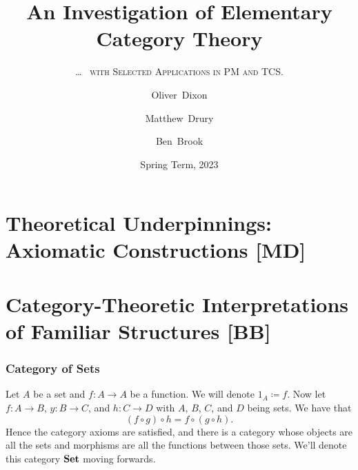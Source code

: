 \documentclass{beamer}
\title[Elementary Category Theory]%
{An Investigation of Elementary Category Theory}
\subtitle{\ldots\ \fontfamily{lmr}%
        \textsc{with Selected Applications in PM and TCS.}}
\author[Dixon, Drury \& Brook]%
{Oliver~Dixon \and Matthew~Drury \and Ben~Brook}
\institute[]{Department of Mathematics, University of York}
\date{Spring Term, 2023}
\numberwithin{figure}{section}
\DeclareMathOperator{\catset}{\text{\textbf{Set}}}
\begin{document}

\frame{\titlepage}

\section{Theoretical Underpinnings: Axiomatic Constructions [MD]}

\section{Category-Theoretic Interpretations of Familiar Structures [BB]}
\begin{frame}
        \frametitle{Category of Sets}
        Let $A$ be a set and $f \colon A \to A$ be a function. We will denote
        $1_A \coloneqq f$.  Now let $f \colon A \to B$, $y \colon B \to C$, and
        $h \colon C \to D$ with $A$, $B$, $C$, and $D$ being sets. We have that
        \begin{equation*}
                \left( f \circ g \right) \circ h = f \circ \left( g \circ h
                \right) .
        \end{equation*}
        Hence the category axioms are satisfied, and there is a category whose
        objects are all the sets and morphisms are all the functions between
        those sets. We'll denote this category $\catset$ moving forwards.
\end{frame}
\end{document}
